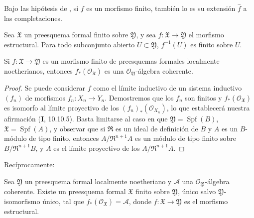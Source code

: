 \begin{corollary}[4.8.4]
\label{III.4.8.4}
\label{III.4.8.4-fr}
Bajo las hipótesis de , si $f$ es un morfismo
finito, también lo es su extensión $\widehat f$ a las
completaciones.
\end{corollary}

\begin{corollary}[4.8.5]
\label{III.4.8.5}
\label{III.4.8.5-fr}
Sea $\mathfrak X$ un preesquema formal finito sobre
$\mathfrak Y$, y sea
$f:\mathfrak X\to\mathfrak Y$ el morfismo estructural. Para
todo subconjunto abierto $U\subset\mathfrak Y$, $f^{-1}(U)$ es finito sobre $U$.
\end{corollary}

\begin{proposition}[4.8.6]
\label{III.4.8.6}
\label{III.4.8.6-fr}
Si $f:\mathfrak X\to\mathfrak Y$ es un morfismo finito de preesquemas
formales localmente noetherianos, entonces
$f_*(\mathcal O_{\mathfrak X})$ es una
$\mathcal O_{\mathfrak Y}$-álgebra coherente.
\end{proposition}

\begin{proof}
Se puede considerar $f$ como el límite inductivo de un sistema inductivo
$(f_n)$ de morfismos $f_n:X_n\to Y_n$. Demostremos que los
$f_n$ son finitos y $f_*(\mathcal O_{\mathfrak X})$ es
isomorfo al límite proyectivo de los
$(f_n)_*(\mathcal O_{X_n})$, lo que establecerá nuestra afirmación (\textbf{I}, 10.10.5).
Basta limitarse al caso en que $\mathfrak Y=\operatorname{Spf}(B)$,
$\mathfrak X=\operatorname{Spf}(A)$, y observar que si $\mathfrak R$ es un ideal de definición
de $B$ y $A$ es un $B$-módulo de tipo finito, entonces
$A/\mathfrak R^{n+1}A$ es un módulo de tipo finito sobre
$B/\mathfrak R^{n+1}B$, y $A$ es el límite proyectivo de los
$A/\mathfrak R^{n+1}A$.
\end{proof}

Recíprocamente:

\begin{proposition}[4.8.7]
\label{III.4.8.7}
\label{III.4.8.7-fr}
Sea $\mathfrak Y$ un preesquema formal localmente noetheriano y
$\mathcal A$ una $\mathcal O_{\mathfrak Y}$-álgebra coherente. Existe
un preesquema formal $\mathfrak X$ finito sobre $\mathfrak Y$,
único salvo $\mathfrak Y$-isomorfismo único, tal que
$f_*(\mathcal O_{\mathfrak X})=\mathcal A$,
donde $f:\mathfrak X\to\mathfrak Y$ es el morfismo estructural.
\end{proposition}

